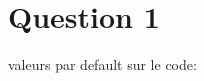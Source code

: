 \documentclass[../CSC_5RO12_TA_TP4.tex]{subfiles}
\begin{document}
\section{Question 1}

valeurs par default sur le code:



\end{document}
